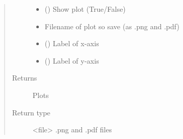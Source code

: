 \documentclass[letterpaper,10pt,english,openany,oneside]{sphinxmanual}
\begin{document}
\begin{fulllineitems}
\begin{quote}
\begin{description}
\begin{itemize}
\item {} 
 (\sphinxstyleliteralemphasis{\sphinxupquote{, }}) \textendash{} Show plot (True/False)

\item {} 
 \textendash{} Filename of plot so save (as .png and .pdf)

\item {} 
 (\sphinxstyleliteralemphasis{\sphinxupquote{ (}}\sphinxstyleliteralemphasis{\sphinxupquote{)}}) \textendash{} Label of x-axis

\item {} 
 (\sphinxstyleliteralemphasis{\sphinxupquote{ (}}\sphinxstyleliteralemphasis{\sphinxupquote{)}}) \textendash{} Label of y-axis

\end{itemize}

\item[{Returns}] \leavevmode
Plots

\item[{Return type}] \leavevmode
\textless{}file\textgreater{} .png and .pdf files

\end{description}\end{quote}

\end{fulllineitems}

\end{document}
